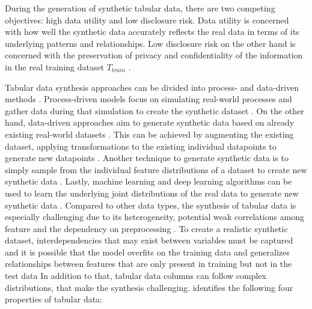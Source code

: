 During the generation of synthetic tabular data, there are two competing objectives: high data utility and low disclosure risk.
Data utility is concerned with how well the synthetic data accurately reflects the real data in terms of its underlying patterns and relationships.
Low disclosure risk on the other hand is concerned with the preservation of privacy and confidentiality of the information in the real training dataset $T_{train}$ \cite{little2021GenerativeAdversarialNetworksa}. 

Tabular data synthesis approaches can be divided into process- and data-driven methods \cite{goncalves2020GenerationEvaluationSynthetic}.
Process-driven models focus on simulating real-world processes and gather data during that simulation to create the synthetic dataset \cite{kowalczyk2022TaxonomyUseSynthetic}.
On the other hand, data-driven approaches aim to generate synthetic data based on already existing real-world datasets \cite{kowalczyk2022TaxonomyUseSynthetic}.
This can be achieved by augmenting the existing dataset, \ie applying transformations to the existing individual datapoints to generate new datapoints \cite{kowalczyk2022TaxonomyUseSynthetic}.
Another technique to generate synthetic data is to simply sample from the individual feature distributions of a dataset to create new synthetic data \cite{kowalczyk2022TaxonomyUseSynthetic}.
Lastly, machine learning and deep learning algorithms can be used to learn the underlying joint distributions of the real data to generate new synthetic data \cite{kowalczyk2022TaxonomyUseSynthetic}. 
Compared to other data types, the synthesis of tabular data is especially challenging due to its heterogeneity, potential weak correlations among feature and the dependency on preprocessing \cite{borisov2022DeepNeuralNetworks, yoon2020VIMEExtendingSuccess, gorishniy2022EmbeddingsNumericalFeatures}.
To create a realistic synthetic dataset, interdependencies that may exist between variables must be captured and 
it is possible that the model overfits on the training data and generalizes relationships between features that are only present in training but not in the test data \cite{lederrey2022DATGANIntegratingExperta}
In addition to that, tabular data columns can follow complex distributions, that make the synthesis challenging.
\cite{zhao2022CTABGANEnhancingTabular} identifies the following four properties of tabular data:

